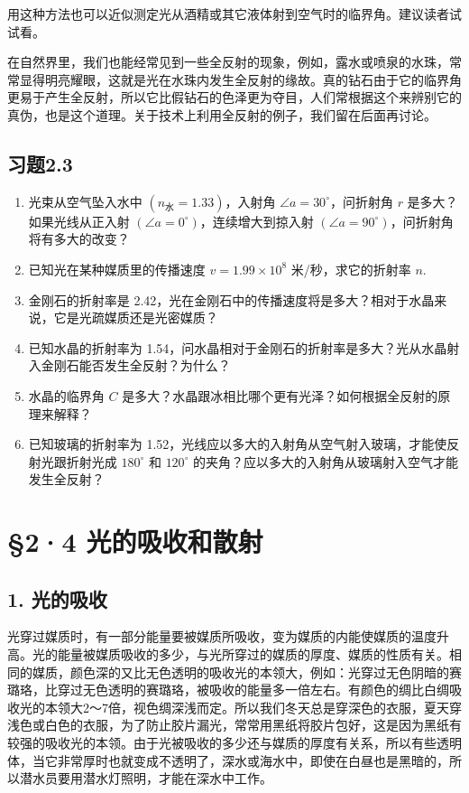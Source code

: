用这种方法也可以近似测定光从酒精或其它液体射到空气时的临界角。建议读者试试看。

在自然界里，我们也能经常见到一些全反射的现象，例如，露水或喷泉的水珠，常常显得明亮耀眼，这就是光在水珠内发生全反射的缘故。真的钻石由于它的临界角更易于产生全反射，所以它比假钻石的色泽更为夺目，人们常根据这个来辨别它的真伪，也是这个道理。关于技术上利用全反射的例子，我们留在后面再讨论。

\subsection{习题2.3}

\begin{enumerate}
\item
  光束从空气坠入水中 \((n_{\text{水}} = 1.33)\)，入射角
  \(\angle a = 30^{\circ}\)，问折射角 \(r\) 是多大？如果光线从正入射
  \((\angle a = 0^{\circ})\)，连续增大到掠入射
  \((\angle a = 90^{\circ})\)，问折射角将有多大的改变？
\item
  已知光在某种媒质里的传播速度 \(v = 1.99 \times 10^{8}\)
  米/秒，求它的折射率 \(n\).
\item
  金刚石的折射率是
  2.42，光在金刚石中的传播速度将是多大？相对于水晶来说，它是光疏媒质还是光密媒质？
\item
  已知水晶的折射率为
  1.54，问水晶相对于金刚石的折射率是多大？光从水晶射入金刚石能否发生全反射？为什么？
\item
  水晶的临界角 \(C\)
  是多大？水晶跟冰相比哪个更有光泽？如何根据全反射的原理来解释？
\item
  已知玻璃的折射率为
  1.52，光线应以多大的入射角从空气射入玻璃，才能使反射光跟折射光成
  \(180^{\circ}\) 和 \(120^{\circ}\)
  的夹角？应以多大的入射角从玻璃射入空气才能发生全反射？
\end{enumerate}

\section{§2·4
光的吸收和散射}

\subsection{1. 光的吸收}

光穿过媒质时，有一部分能量要被媒质所吸收，变为媒质的内能使媒质的温度升高。光的能量被媒质吸收的多少，与光所穿过的媒质的厚度、媒质的性质有关。相同的媒质，颜色深的又比无色透明的吸收光的本领大，例如：光穿过无色阴暗的赛璐珞，比穿过无色透明的赛璐珞，被吸收的能量多一倍左右。有颜色的绸比白绸吸收光的本领大2～7倍，视色绸深浅而定。所以我们冬天总是穿深色的衣服，夏天穿浅色或白色的衣服，为了防止胶片漏光，常常用黑纸将胶片包好，这是因为黑纸有较强的吸收光的本领。由于光被吸收的多少还与媒质的厚度有关系，所以有些透明体，当它非常厚时也就变成不透明了，深水或海水中，即使在白昼也是黑暗的，所以潜水员要用潜水灯照明，才能在深水中工作。

